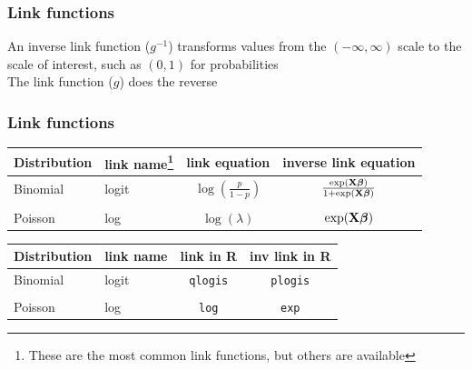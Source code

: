 \documentclass[color=usenames,dvipsnames]{beamer}\usepackage[]{graphicx}\usepackage[]{color}
\begin{document}
\begin{frame}
  \frametitle{Link functions}
  An inverse link function ($g^{-1}$) transforms values from the $(-\infty,\infty)$
  scale to the scale of interest, such as $(0,1)$ for probabilities  \\
  \pause
  \vfill
  The link function ($g$) does the reverse \\
\end{frame}


\begin{frame}
  \frametitle{Link functions}
  \centering
  \begin{tabular}{llcc}
    \hline
    Distribution & link name\footnote{\scriptsize These are the most common link functions, but others are available} & link equation             & inverse link equation       \\
    \hline
    Binomial     & logit     & $\log(\frac{p}{1-p})$ & $\frac{\exp({\bf
          X}{\bm \beta})}{1 + \exp({\bf X}{\bm \beta})}$                        \\
                 &           &                           &                             \\
    Poisson      & log       & $\log(\lambda)$               & $\exp({\bf X}{\bm \beta})$  \\
    \hline
  \end{tabular}

\pause
\vfill

\begin{tabular}{llcc}
    \hline
    Distribution & link name & link in {\bf R}  & inv link in {\bf R}       \\
    \hline
    Binomial     & logit     & {\tt qlogis} & {\tt plogis}                        \\
                 &           &                           &                             \\
    Poisson      & log       & {\tt log}    & {\tt exp}  \\
    \hline
  \end{tabular}
\end{frame}
\end{document}
